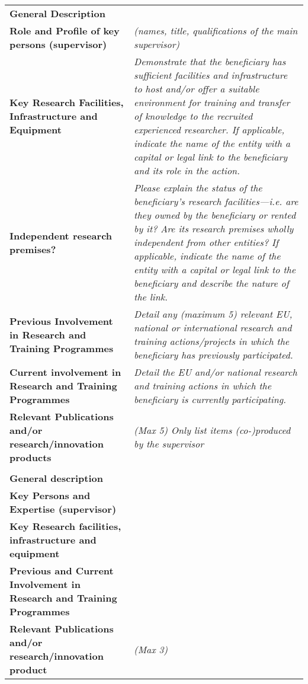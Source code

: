 \begin{table}[h!]
{\fontsize{9bp}{1em}\selectfont %
\noindent\begin{tabular}{|>{\raggedright}p{}|p{}|}\hline
  \multicolumn{2}{|l|}{\cellcolor{gray!50}\textbf{Beneficiary X}} \\\hline
\textbf{General Description} &

\\\hline
\textbf{Role and Profile of key persons (supervisor)} &
{\em (names, title, qualifications of the main supervisor)}
{\em }
\\\hline
\textbf{Key Research Facilities, Infrastructure and Equipment} &
{\em Demonstrate that the beneficiary has sufficient facilities and infrastructure to host and/or offer a suitable environment for training and transfer of knowledge to the recruited experienced researcher.
\newline
If applicable, indicate the name of the entity with a capital or
legal link to the beneficiary and its role in the action.
}
\\\hline
\textbf{Independent research premises?} &
{\em Please explain the status of the beneficiary's research facilities\----i.e. are they owned by the beneficiary or rented by it? Are its research premises wholly independent from other entities?
\newline
If applicable, indicate the name of the entity with a capital or
legal link to the beneficiary and describe the nature of the
link.
}
\\\hline
\textbf{Previous Involvement in Research and Training Programmes} &
{\em Detail any (maximum 5) relevant EU, national or international research and training actions/projects in which the beneficiary has previously participated.}
\\\hline
\textbf{Current involvement in Research and Training Programmes} &
{\em Detail the EU and/or national research and training actions in which the beneficiary is currently participating.}
\\\hline
\textbf{Relevant Publications and/or research/innovation products} &
{\em (Max 5) Only list items (co-)produced by the supervisor}
\\\hline
  \multicolumn{2}{|l|}{\cellcolor{gray!50}\textbf{Partner Organisation Y}} \\\hline
\textbf{General description} &
\\\hline
\textbf{Key Persons and Expertise (supervisor)} &
\\\hline
\textbf{Key Research facilities, infrastructure and equipment} &
\\\hline
\textbf{Previous and Current Involvement in Research and Training Programmes} &
\\\hline
\textbf{Relevant Publications and/or research/innovation product} &
{\em (Max 3)}
\\\hline
\end{tabular}}
\end{table}




